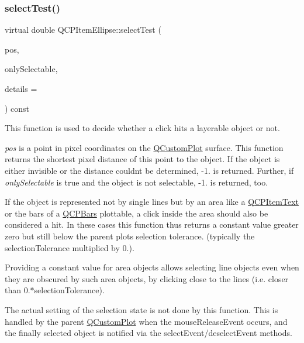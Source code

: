 \subsubsection{\texorpdfstring{select\+Test()}{selectTest()}\hspace{0.1cm}{\footnotesize\ttfamily [2/2]}}
{\footnotesize\ttfamily virtual double Q\+C\+P\+Item\+Ellipse\+::select\+Test (\begin{DoxyParamCaption}\item[{const Q\+PointF \&}]{pos,  }\item[{bool}]{only\+Selectable,  }\item[{Q\+Variant $\ast$}]{details = {} }\end{DoxyParamCaption}) const\hspace{0.3cm}{\ttfamily [virtual]}}

This function is used to decide whether a click hits a layerable object or not.

{\itshape pos} is a point in pixel coordinates on the \hyperlink{class_q_custom_plot}{Q\+Custom\+Plot} surface. This function returns the shortest pixel distance of this point to the object. If the object is either invisible or the distance couldn\textquotesingle{}t be determined, -\/1. is returned. Further, if {\itshape only\+Selectable} is true and the object is not selectable, -\/1. is returned, too.

If the object is represented not by single lines but by an area like a \hyperlink{class_q_c_p_item_text}{Q\+C\+P\+Item\+Text} or the bars of a \hyperlink{class_q_c_p_bars}{Q\+C\+P\+Bars} plottable, a click inside the area should also be considered a hit. In these cases this function thus returns a constant value greater zero but still below the parent plot\textquotesingle{}s selection tolerance. (typically the selection\+Tolerance multiplied by 0.).

Providing a constant value for area objects allows selecting line objects even when they are obscured by such area objects, by clicking close to the lines (i.\+e. closer than 0.$\ast$selection\+Tolerance).

The actual setting of the selection state is not done by this function. This is handled by the parent \hyperlink{class_q_custom_plot}{Q\+Custom\+Plot} when the mouse\+Release\+Event occurs, and the finally selected object is notified via the select\+Event/deselect\+Event methods.

